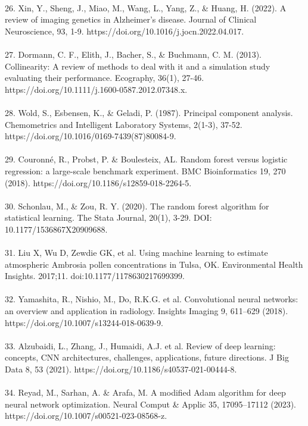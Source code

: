\documentclass[12pt,a4paper]{report}
\begin{document}
\\
26. Xin, Y., Sheng, J., Miao, M., Wang, L., Yang, Z., \& Huang, H. (2022). A review of imaging genetics in Alzheimer's disease. Journal of Clinical Neuroscience, 93, 1-9. https://doi.org/10.1016/j.jocn.2022.04.017. \\
\\
27. Dormann, C. F., Elith, J., Bacher, S., \& Buchmann, C. M. (2013). Collinearity: A review of methods to deal with it and a simulation study evaluating their performance. Ecography, 36(1), 27-46. https://doi.org/10.1111/j.1600-0587.2012.07348.x. \\
\\
28. Wold, S., Esbensen, K., \& Geladi, P. (1987). Principal component analysis. Chemometrics and Intelligent Laboratory Systems, 2(1-3), 37-52. https://doi.org/10.1016/0169-7439(87)80084-9. \\
\\
29. Couronné, R., Probst, P. \& Boulesteix, AL. Random forest versus logistic regression: a large-scale benchmark experiment. BMC Bioinformatics 19, 270 (2018). https://doi.org/10.1186/s12859-018-2264-5.\\
\\
30. Schonlau, M., \& Zou, R. Y. (2020). The random forest algorithm for statistical learning. The Stata Journal, 20(1), 3-29. DOI: 10.1177/1536867X20909688. \\
\\
31. Liu X, Wu D, Zewdie GK, et al. Using machine learning to estimate atmospheric Ambrosia pollen concentrations in Tulsa, OK. Environmental Health Insights. 2017;11. doi:10.1177/1178630217699399. \\
\\
32. Yamashita, R., Nishio, M., Do, R.K.G. et al. Convolutional neural networks: an overview and application in radiology. Insights Imaging 9, 611–629 (2018). https://doi.org/10.1007/s13244-018-0639-9.\\
\\
33. Alzubaidi, L., Zhang, J., Humaidi, A.J. et al. Review of deep learning: concepts, CNN architectures, challenges, applications, future directions. J Big Data 8, 53 (2021). https://doi.org/10.1186/s40537-021-00444-8. \\
\\
34. Reyad, M., Sarhan, A. \& Arafa, M. A modified Adam algorithm for deep neural network optimization. Neural Comput \& Applic 35, 17095–17112 (2023). https://doi.org/10.1007/s00521-023-08568-z.\\
\\
\end{document}
